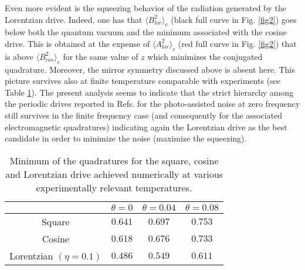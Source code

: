 \documentclass[twocolumn,showpacs,preprintnumbers,amsmath,amssymb%
 aps,
 prb,
 lengthcheck,%
]{revtex4-1}
\begin{document}
Even more evident is the squeezing behavior of the radiation generated by the Lorentzian drive. Indeed, one has that $\langle B^{2}_{lor} \rangle_{c}$ (black full curve in Fig. \ref{fig2}) goes below both the quantum vacuum and the minimum associated with the cosine drive. This is obtained at the expense of $\langle A^{2}_{lor} \rangle_{c}$ (red full curve in Fig. \ref{fig2}) that is above $\langle B^{2}_{cos} \rangle_{c}$ for the same value of $z$ which minimizes the conjugated quadrature.  Moreover, the mirror symmetry discussed above is absent here. This picture survives also at finite temperature comparable with experiments \cite{gasse_observation_2013} (see Table \ref{tab1}). The present analysis seems to indicate that the strict hierarchy among the periodic drives reported in Refs.  for the photo-assisted noise at zero frequency still survives in the finite frequency case (and consequently for the associated electromagnetic quadratures) indicating again the Lorentzian drive as the best candidate in order to minimize the noise (maximize the squeezing). 
\begin{table}
 \begin{tabular}{ | c | c | c | c | }
    \hline
     & $\theta=0$ & $\theta=0.04$ & $\theta=0.08$ \\ \hline
Square & $0.641$ & $0.697$ & $0.753$ \\ \hline 
       Cosine  & $0.618$ & $0.676$ & $0.733$  \\ \hline 
     Lorentzian $(\eta=0.1)$& $0.486$ & $0.549$ & $0.611$ \\ \hline      
    \end{tabular}
    \caption{Minimum of the quadratures for the square, cosine and Lorentzian drive achieved numerically at various experimentally relevant temperatures.}
    \label{tab1}
\end{table}
\end{document}
